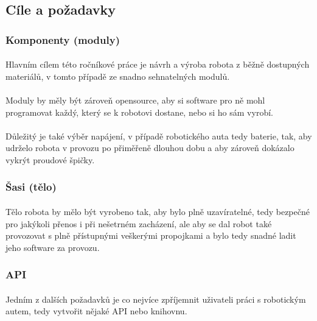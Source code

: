\documentclass[12pt]{article}
\begin{document}
\begin{spacing}{1.5}
	\newpage
	\subsection{Cíle a požadavky}
	
	\subsubsection{Komponenty (moduly)}
	\paragraph{} Hlavním cílem této ročníkové práce je návrh a výroba robota z běžně dostupných materiálů, v tomto případě ze snadno sehnatelných modulů.
	\paragraph{} Moduly by měly být zároveň opensource, aby si software pro ně mohl programovat každý, který se k robotovi dostane, nebo si ho sám vyrobí.
	\paragraph{} Důležitý je také výběr napájení, v případě robotického auta tedy baterie, tak, aby udrželo robota v provozu po přiměřeně dlouhou dobu a aby zároveň dokázalo vykrýt proudové špičky.
	
	\subsubsection{Šasi (tělo)}
	\paragraph{} Tělo robota by mělo být vyrobeno tak, aby bylo plně uzavíratelné, tedy bezpečné pro jakýkoli přenos i při nešetrném zacházení, ale aby se dal robot také provozovat s plně přístupnými veškerými propojkami a bylo tedy snadné ladit jeho software za provozu.
	
	\subsubsection{API}
	\paragraph{} Jedním z dalších požadavků je co nejvíce zpříjemnit uživateli práci s robotickým autem, tedy vytvořit nějaké API nebo knihovnu.

\end{spacing}
\end{document}
